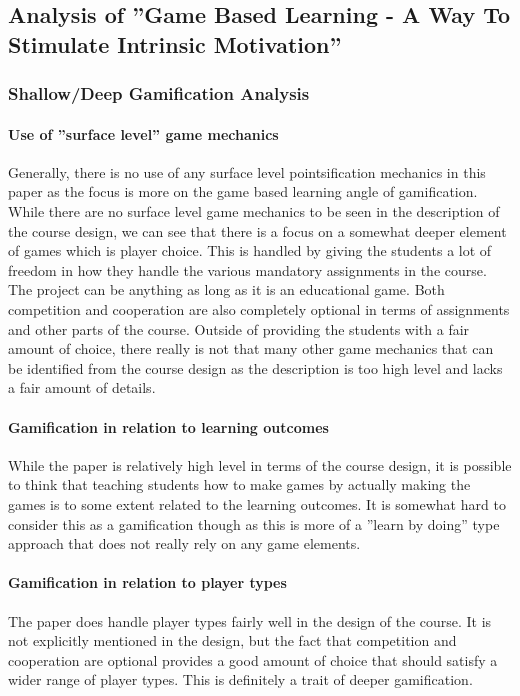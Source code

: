 \subsection{Analysis of ''Game Based Learning - A Way To Stimulate Intrinsic Motivation''}
\subsubsection{Shallow/Deep Gamification Analysis}
\paragraph{Use of ''surface level'' game mechanics}
Generally, there is no use of any surface level pointsification mechanics in this paper as the focus is more on the game based learning angle of gamification. While there are no surface level game mechanics to be seen in the description of the course design, we can see that there is a focus on a somewhat deeper element of games which is player choice. This is handled by giving the students a lot of freedom in how they handle the various mandatory assignments in the course. The project can be anything as long as it is an educational game. Both competition and cooperation are also completely optional in terms of assignments and other parts of the course. Outside of providing the students with a fair amount of choice, there really is not that many other game mechanics that can be identified from the course design as the description is too high level and lacks a fair amount of details. 

\paragraph{Gamification in relation to learning outcomes}
While the paper is relatively high level in terms of the course design, it is possible to think that teaching students how to make games by actually making the games is to some extent related to the learning outcomes. It is somewhat hard to consider this as a gamification though as this is more of a ''learn by doing'' type approach that does not really rely on any game elements.

\paragraph{Gamification in relation to player types}
The paper does handle player types fairly well in the design of the course. It is not explicitly mentioned in the design, but the fact that competition and cooperation are optional provides a good amount of choice that should satisfy a wider range of player types. This is definitely a trait of deeper gamification. 

